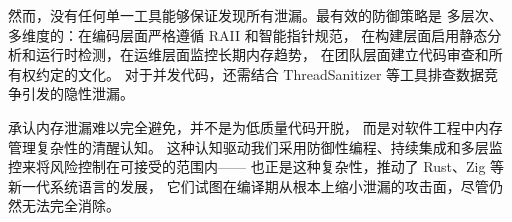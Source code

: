 \documentclass[12pt,a4paper,fontset=fandol]{ctexbook}
\begin{document}
然而，没有任何单一工具能够保证发现所有泄漏。最有效的防御策略是
多层次、多维度的：在编码层面严格遵循 RAII 和智能指针规范，
在构建层面启用静态分析和运行时检测，在运维层面监控长期内存趋势，
在团队层面建立代码审查和所有权约定的文化。
对于并发代码，还需结合 ThreadSanitizer 等工具排查数据竞争引发的隐性泄漏。

承认内存泄漏难以完全避免，并不是为低质量代码开脱，
而是对软件工程中内存管理复杂性的清醒认知。
这种认知驱动我们采用防御性编程、持续集成和多层监控来将风险控制在可接受的范围内——
也正是这种复杂性，推动了 Rust、Zig 等新一代系统语言的发展，
它们试图在编译期从根本上缩小泄漏的攻击面，尽管仍然无法完全消除。
\end{document}
